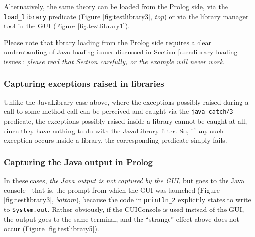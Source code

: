 Alternatively, the same theory can be loaded from the Prolog side, via the \texttt{load\_library} predicate (Figure \ref{fig:testlibrary3}, \textit{top}) or via the library manager tool in the GUI (Figure \ref{fig:testlibrary1}).

Please note that library loading from the Prolog side requires a clear understanding of Java loading issues discussed in Section \ref{ssec:library-loading-issues}: \textit{please read that Section carefully, or the example will never work}.

\subsubsection{Capturing exceptions raised in libraries}

Unlike the JavaLibrary case above, where the exceptions possibly raised during a call to some method call can be perceived and caught via the \texttt{java\_catch/3} predicate, the exceptions possibly raised inside a \tuprolog{} library cannot be caught at all, since they have nothing to do with the JavaLibrary filter.
So, if any such exception occurs inside a library, the corresponding predicate simply fails.

\subsubsection{Capturing the Java output in Prolog}

In these cases, \textit{the Java output is not captured by the \tuprolog{} GUI}, but goes to the Java console---that is, the prompt from which the GUI was launched (Figure \ref{fig:testlibrary3}, \textit{bottom}), because the code in \texttt{println\_2} explicitly states to write to \texttt{System.out}.
Rather obviously, if the CUIConsole is used instead of the GUI, the output goes to the same terminal, and the ``strange'' effect above does not occur (Figure \ref{fig:testlibrary5}).

